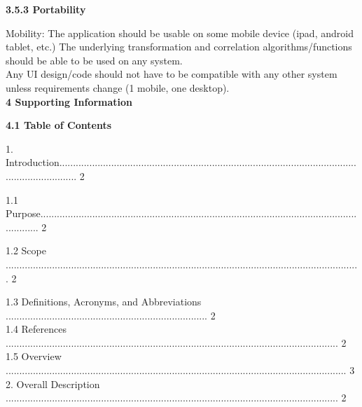 \documentclass[10pt,draftclsnofoot,onecolumn]{IEEEtran}
\newcommand\tab[1][1cm]{\hspace*{#1}}
\begin{document}
     {\Medium\textbf{3.5.3 Portability}} \\
     \vspace{5mm}

Mobility: The application should be usable on some mobile device (ipad, android tablet, etc.)
The underlying transformation and correlation algorithms/functions should be able to be used on any system.\\
 \vspace{2mm}
Any UI design/code should not have to be compatible with any other system unless requirements change (1 mobile, one desktop).\\
    \vspace{5mm}
 {\Large\textbf{4 Supporting Information}} \\
     \vspace{5mm}

     {\Medium\textbf{4.1 Table of Contents}} \\
          \vspace{5mm}

1. Introduction....................................................................................................................................... 2\\
          \vspace{5mm}

   \tab 1.1 Purpose................................................................................................................................ 2\\
              \vspace{5mm}

   \tab 1.2 Scope .................................................................................................................................. 2\\
                 \vspace{5mm}

   \tab 1.3 Definitions, Acronyms, and Abbreviations .......................................................................... 2\\

                 \vspace{5mm}
     \tab 1.4 References .......................................................................................................................... 2\\
                 \vspace{5mm}
    \tab 1.5 Overview ............................................................................................................................. 3\\
                 \vspace{5mm}
2. Overall Description .......................................................................................................................... 2\\
                 \vspace{5mm}
\end{document}
